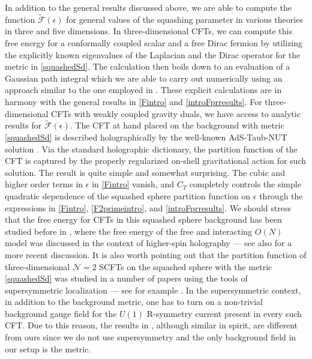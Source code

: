\documentclass[12pt]{article}
\numberwithin{equation}{section}
\newcommand{\ssc}{\scriptscriptstyle}
\newcommand{\ctt}{C_{\ssc T}}
\begin{document}
In addition to the general results discussed above, we are able to compute the function $\tilde{\mathcal{F}}(\epsilon)$ for general values of the squashing parameter in various theories in three and five dimensions. In three-dimensional CFTs, we can compute this free energy for a conformally coupled scalar and a free Dirac fermion by utilizing the explicitly known eigenvalues of the Laplacian and the Dirac operator for the metric in \eqref{squashedSd}. The calculation then boils down to an evaluation of a Gaussian path integral which we are able to carry out numerically using an approach similar to the one employed in \cite{Anninos:2012ft, Anninos:2013rza,Bobev:2016sap}. These explicit calculations are in harmony with the general results in \eqref{Fintro} and \eqref{introFprresults}. For three-dimensional CFTs with weakly coupled gravity duals, we have access to analytic results for $\tilde{\mathcal{F}}(\epsilon)$. The CFT at hand placed on the background with metric \eqref{squashedSd} is described holographically by the well-known AdS-Taub-NUT solution \cite{Hawking:1998ct,Chamblin:1998pz}. Via the standard holographic dictionary, the partition function of the CFT is captured by the properly regularized on-shell gravitational action for such solution. The result is quite simple and somewhat surprising. The cubic and higher order terms in $\epsilon$ in \eqref{Fintro} vanish, and $\ctt$ completely controls the simple quadratic dependence of the squashed sphere partition function on $\epsilon$ through the expressions in \eqref{Fintro}, \eqref{F2primeintro}, and \eqref{introFprresults}. We should stress that the free energy for CFTs in this squashed sphere background has been studied before in \cite{Hartnoll:2005yc}, where the free energy of the free and interacting $O(N)$ model was discussed in the context of higher-spin holography --- see also \cite{Anninos:2012ft, Anninos:2013rza,Bobev:2016sap} for a more recent discussion. It is also worth pointing out that the partition function of three-dimensional $\mathcal{N}=2$ SCFTs on the squashed sphere with the metric \eqref{squashedSd} was studied in a number of papers using the tools of supersymmetric localization --- see for example \cite{Hama:2011ea,Imamura:2011wg}. In the supersymmetric context, in addition to the background metric, one has to turn on a non-trivial background gauge field for the $U(1)$ R-symmetry current present in every such CFT. Due to this reason, the results in \cite{Closset:2012ru}, although similar in spirit, are different from ours since we do not use supersymmetry and the only background field in our setup is the metric.
\end{document}
